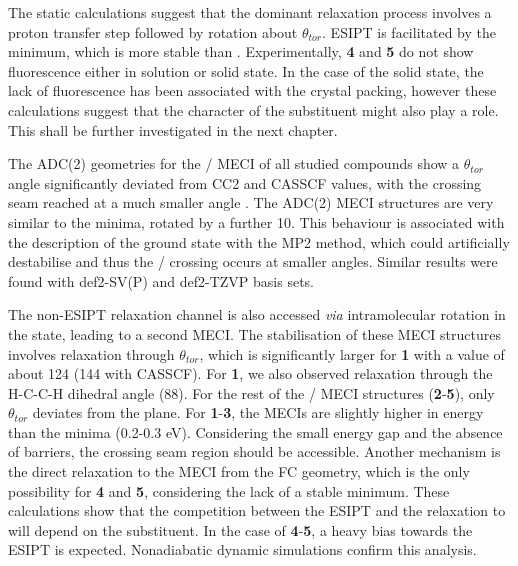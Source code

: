 The static calculations suggest that the dominant relaxation process involves a proton transfer step followed by rotation about $\theta_{tor}$. ESIPT is facilitated by the \Kstar{} minimum, which is more stable than \Estar. Experimentally, \textbf{4} and \textbf{5} do not show fluorescence either in solution or solid state. In the case of the solid state, the lack of fluorescence has been associated with the crystal packing, however these calculations suggest that the character of the substituent might also play a role. This shall be further investigated in the next chapter.

The ADC(2) geometries for the \Kstar{} \sone/\szero{} MECI of all studied compounds show a $\theta_{tor}$ angle significantly deviated from CC2 and CASSCF values, with the crossing seam reached at a much smaller angle . The ADC(2) MECI structures are very similar to the \Kstar{} minima, rotated by a further 10\textdegree{}. This behaviour is associated with the description of the ground state with the MP2 method, which could artificially destabilise \szero{} and thus the \sone/\szero{}  crossing occurs at smaller angles. Similar results were found with def2-SV(P) and def2-TZVP basis sets.

The non-ESIPT relaxation channel is also accessed \textit{via} intramolecular rotation in the \Estar{} state, leading to a second MECI. The stabilisation of these MECI structures involves relaxation through $\theta_{tor}$, which is significantly larger for \textbf{1} with a value of about 124\textdegree{} (144\textdegree{} with CASSCF). For \textbf{1}, we also observed relaxation through the H-C-C-H dihedral angle (88\textdegree{}). For the rest of the \sone/\szero{} MECI structures (\textbf{2}-\textbf{5}), only $\theta_{tor}$ deviates from the plane. For \textbf{1}-\textbf{3}, the \Estar{} MECIs are slightly higher in energy than the \Estar{} minima (0.2-0.3 eV).  Considering the small energy gap and the absence of barriers, the crossing seam region should be accessible. Another mechanism is the direct relaxation to the MECI from the FC geometry, which is the only possibility for \textbf{4} and \textbf{5}, considering the lack of a stable \Estar{} minimum. These calculations show that the competition between the ESIPT and the relaxation to \Estar{} will depend on the substituent. In the case of \textbf{4}-\textbf{5}, a heavy bias towards the ESIPT is expected. Nonadiabatic dynamic simulations confirm this analysis. 
